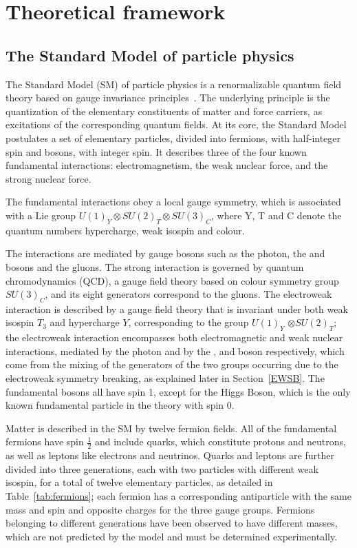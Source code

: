 \chapter{Theoretical framework}
\label{sec:theory}
\section{The Standard Model of particle physics}
The Standard Model (SM) of particle physics is a renormalizable quantum field theory based on gauge invariance principles~\cite{Peskin:1995ev,novaes2000standard}.
The underlying principle is the quantization of the elementary constituents of matter and force carriers,
as excitations of the corresponding quantum fields.
At its core, the Standard Model postulates a set of elementary particles, divided into fermions, with half-integer spin and bosons, with integer spin.
It describes three of the four known fundamental interactions: electromagnetism, the weak nuclear force, and the strong nuclear force.

The fundamental interactions obey a local gauge symmetry, which is associated with a Lie group $U(1)_Y \otimes SU(2)_T \otimes SU(3)_C$,
where Y, T and C denote the quantum numbers hypercharge, weak isospin and colour.

The interactions are mediated by gauge bosons such as the photon, the \PW and \PZ bosons and the gluons.
The strong interaction is governed by quantum chromodynamics (QCD), a gauge field theory based on colour symmetry group $SU(3)_C$,
and its eight generators correspond to the gluons.
The electroweak interaction is described by a gauge field theory that is invariant under both weak isospin $T_3$ and hypercharge $Y$,
corresponding to the group $U(1)_Y$ $\otimes SU(2)_T$;
the electroweak interaction encompasses both electromagnetic and weak nuclear interactions,
mediated by the photon and by the \PWp, \PWm and \PZz boson respectively,
which come from the mixing of the generators of the two groups
occurring due to the electroweak symmetry breaking,
as explained later in Section~\ref{EWSB}.
The fundamental bosons all have spin 1, except for the Higgs Boson, which is the only known fundamental particle in the theory with spin 0.

Matter is described in the SM by twelve fermion fields.
All of the fundamental fermions have spin $\frac{1}{2}$ and include quarks, which constitute protons and neutrons, as well as leptons like electrons and neutrinos.
Quarks and leptons are further divided into three generations, each with two particles with different weak isospin, for a total of twelve elementary particles, as detailed in Table~\ref{tab:fermions}; each fermion has a corresponding antiparticle with the same mass and spin and opposite charges for the three gauge groups.
Fermions belonging to different generations have been observed to have different masses, which are not predicted by the model and must be determined experimentally.

